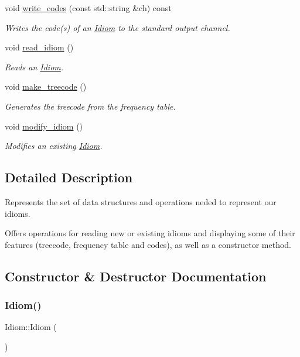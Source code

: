 \begin{DoxyCompactItemize}
void \hyperlink{classIdiom_afc92894b2350b0394b0e4d44f23095b2}{write\+\_\+codes} (const std\+::string \&ch) const
\begin{DoxyCompactList}\small\item\em Writes the code(s) of an \hyperlink{classIdiom}{Idiom} to the standard output channel. \end{DoxyCompactList}\item 
void \hyperlink{classIdiom_a13134381f333552d2283acf188b2285c}{read\+\_\+idiom} ()
\begin{DoxyCompactList}\small\item\em Reads an \hyperlink{classIdiom}{Idiom}. \end{DoxyCompactList}\item 
void \hyperlink{classIdiom_adf84ec3e906a170e6f4c6415a07eb300}{make\+\_\+treecode} ()
\begin{DoxyCompactList}\small\item\em Generates the treecode from the frequency table. \end{DoxyCompactList}\item 
void \hyperlink{classIdiom_ac9e8c47f009912c613b4b3337ad664d6}{modify\+\_\+idiom} ()
\begin{DoxyCompactList}\small\item\em Modifies an existing \hyperlink{classIdiom}{Idiom}. \end{DoxyCompactList}\end{DoxyCompactItemize}


\subsection{Detailed Description}
Represents the set of data structures and operations neded to represent our idioms. 

Offers operations for reading new or existing idioms and displaying some of their features (treecode, frequency table and codes), as well as a constructor method. 

\subsection{Constructor \& Destructor Documentation}
\mbox{\label{classIdiom_aa32393a932b72825782d348e6f4ddecb}} 
\subsubsection{\texorpdfstring{Idiom()}{Idiom()}}
{\footnotesize\ttfamily Idiom\+::\+Idiom (\begin{DoxyParamCaption}{ }\end{DoxyParamCaption})}



